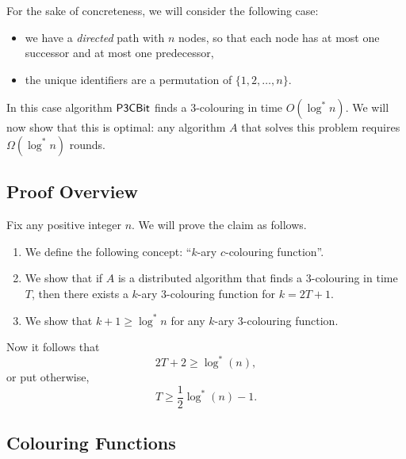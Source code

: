 For the sake of concreteness, we will consider the following case:
\begin{itemize}
    \item we have a \emph{directed} path with $n$ nodes, so that each node has at most one successor and at most one predecessor,
    \item the unique identifiers are a permutation of $\{1,2,\dotsc,n\}$.
\end{itemize}
In this case algorithm $\textsf{P3CBit}$ finds a $3$-colouring in time $O(\log^* n)$. We will now show that this is optimal: any algorithm $A$ that solves this problem requires $\Omega(\log^* n)$ rounds.


\subsection{Proof Overview}

Fix any positive integer $n$. We will prove the claim as follows.
\begin{enumerate}
    \item We define the following concept: ``$k$-ary $c$-colouring function''.
    \item We show that if $A$ is a distributed algorithm that finds a $3$-colouring in time $T$, then there exists a $k$-ary $3$-colouring function for $k = 2T+1$.
    \item We show that $k + 1 \ge \log^* n$ for any $k$-ary $3$-colouring function.
\end{enumerate}
Now it follows that
\[
    2T + 2 \ge \log^*(n),
\]
or put otherwise,
\[
    T \ge \frac{1}{2}\log^*(n) - 1.
\]


\subsection{Colouring Functions}

